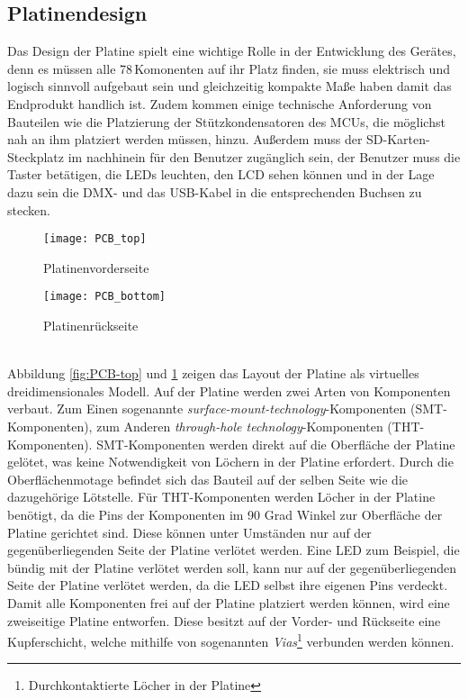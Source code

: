 
\subsection{Platinendesign} \label{sec:PCB-Design}
Das Design der Platine spielt eine wichtige Rolle in der Entwicklung des Gerätes, denn es müssen alle 78\,Komonenten auf ihr Platz finden, sie muss elektrisch und logisch sinnvoll aufgebaut sein und gleichzeitig kompakte Maße haben damit das Endprodukt handlich ist. Zudem kommen einige technische Anforderung von Bauteilen wie die Platzierung der Stützkondensatoren des MCUs, die möglichst nah an ihm platziert werden müssen, hinzu. Außerdem muss der SD-Karten-Steckplatz im nachhinein für den Benutzer zugänglich sein, der Benutzer muss die Taster betätigen, die LEDs leuchten, den LCD sehen können und in der Lage dazu sein die DMX- und das USB-Kabel in die entsprechenden Buchsen zu stecken.
\begin{figure}[h]
	\centering
	\begin{minipage}[t]{0.47\linewidth}
		\centering
		\texttt{[image: PCB\_top]}
		\caption{Platinenvorderseite}
		\label{fig:PCB-top}
	\end{minipage}
	\hfil
	\begin{minipage}[t]{0.47\linewidth}
		\centering
		\texttt{[image: PCB\_bottom]}
		\caption{Platinenrückseite}
		\label{fig:PCB-bottom}
	\end{minipage}
\end{figure}\\
Abbildung \ref{fig:PCB-top} und \ref{fig:PCB-bottom} zeigen das Layout der Platine als virtuelles dreidimensionales Modell. 
Auf der Platine werden zwei Arten von Komponenten verbaut. Zum Einen sogenannte \textit{surface-mount-technology}-Komponenten (SMT-Komponenten), zum Anderen \textit{through-hole technology}-Komponenten (THT- Komponenten). SMT-Komponenten werden direkt auf die Oberfläche der Platine gelötet, was keine Notwendigkeit von Löchern in der Platine erfordert. Durch die Oberflächenmotage befindet sich das Bauteil auf der selben Seite wie die dazugehörige Lötstelle. Für THT-Komponenten werden Löcher in der Platine benötigt, da die Pins der Komponenten im 90 Grad Winkel zur Oberfläche der Platine gerichtet sind. Diese können unter Umständen nur auf der gegenüberliegenden Seite der Platine verlötet werden. Eine LED zum Beispiel, die bündig mit der Platine verlötet werden soll, kann nur auf der gegenüberliegenden Seite der Platine verlötet werden, da die LED selbst ihre eigenen Pins verdeckt. Damit alle Komponenten frei auf der Platine platziert werden können, wird eine zweiseitige Platine entworfen. Diese besitzt auf der Vorder- und Rückseite eine Kupferschicht, welche mithilfe von sogenannten \textit{Vias}\footnote{Durchkontaktierte Löcher in der Platine} verbunden werden können.
